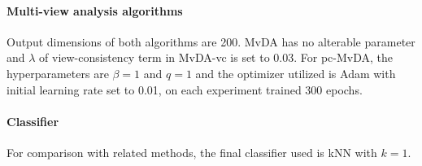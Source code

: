         \paragraph{Multi-view analysis algorithms}
        Output dimensions of both algorithms are 200. MvDA has no alterable parameter and $\lambda$ of view-consistency term in MvDA-vc is set to 0.03.
        For pc-MvDA, the hyperparameters are $\beta = 1$ and $q = 1$ and the optimizer utilized is Adam with initial learning rate set to 0.01, on each experiment trained 300 epochs.

        \paragraph{Classifier}
        For comparison with related methods, the final classifier used is kNN with $k = 1$.
